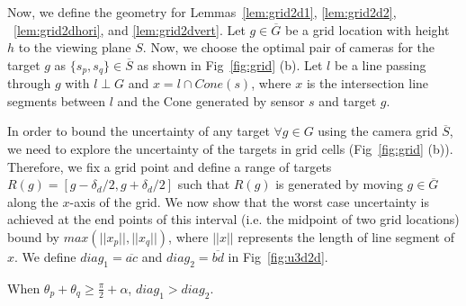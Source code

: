 Now, we define the geometry for Lemmas~\ref{lem:grid2d1}, \ref{lem:grid2d2}, ~\ref{lem:grid2dhori}, and \ref{lem:grid2dvert}. 
Let $g \in \overline{G}$ be a grid location with height $h$ to the viewing plane $S$. Now, we choose the optimal pair of cameras for the target $g$ as $\{s_p,s_q\} \in \overline{S}$ as shown in Fig~\ref{fig:grid} (b). Let $l$ be a line passing through $g$ with $l \perp G$ and $x = l \cap Cone(s)$, where $x$ is the intersection line segments between $l$ and the Cone generated by sensor $s$ and target $g$. 

In order to bound the uncertainty of any target $\forall g \in G$ using the camera grid $\overline{S}$, we need to explore the uncertainty of the targets in grid cells (Fig~\ref{fig:grid} (b)). Therefore, we fix a grid point and define a range of targets $R(g) = [g-\delta_d/2, g+\delta_d/2]$ such that $R(g)$ is generated by moving $g \in \overline{G}$ along the $x$-axis of the grid. We now show that the worst case uncertainty is achieved at the end points of this interval (i.e. the midpoint of two grid locations) bound by $max(||x_p||, ||x_q||)$, where $||x||$ represents the length of line segment of $x$. We define $diag_1 = \overline{ac}$ and $diag_2 = \overline{bd}$ in Fig~\ref{fig:u3d2d}.

\begin{lemma}\label{lem:grid2d1}
When $\theta_p + \theta_q \geq \frac{\pi}{2} + \alpha$, $diag_1 > diag_2$.  
\end{lemma}




